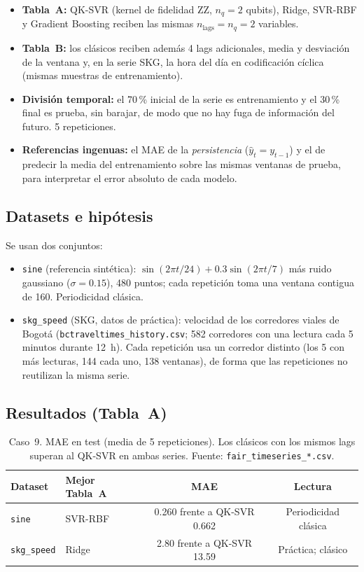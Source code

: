 \begin{itemize}
  \item \textbf{Tabla~A:} QK-SVR (kernel de fidelidad ZZ, $n_q=2$ qubits), Ridge, SVR-RBF y Gradient Boosting reciben las mismas $n_{\mathrm{lags}}=n_q=2$ variables.
  \item \textbf{Tabla~B:} los clásicos reciben además 4 lags adicionales, media y desviación de la ventana y, en la serie SKG, la hora del día en codificación cíclica (mismas muestras de entrenamiento).
  \item \textbf{División temporal:} el 70\,\% inicial de la serie es entrenamiento y el 30\,\% final es prueba, sin barajar, de modo que no hay fuga de información del futuro. 5 repeticiones.
  \item \textbf{Referencias ingenuas:} el MAE de la \emph{persistencia} ($\hat y_t=y_{t-1}$) y el de predecir la media del entrenamiento sobre las mismas ventanas de prueba, para interpretar el error absoluto de cada modelo.
\end{itemize}

\subsection{Datasets e hipótesis}

Se usan dos conjuntos:

\begin{itemize}
  \item \texttt{sine} (referencia sintética): $\sin(2\pi t/24)+0.3\sin(2\pi t/7)$ más ruido gaussiano ($\sigma=0.15$), 480 puntos; cada repetición toma una ventana contigua de 160. Periodicidad clásica.
  \item \texttt{skg\_speed} (SKG, datos de práctica): velocidad de los corredores viales de Bogotá (\texttt{bctraveltimes\_history.csv}; 582 corredores con una lectura cada 5 minutos durante 12~h). Cada repetición usa un corredor distinto (los 5 con más lecturas, 144 cada uno, 138 ventanas), de forma que las repeticiones no reutilizan la misma serie.
\end{itemize}

\subsection{Resultados (Tabla~A)}

\begin{table}[ht]
\centering
\small
\begin{tabular}{llcc}
\hline
\textbf{Dataset} & \textbf{Mejor Tabla~A} & \textbf{MAE} & \textbf{Lectura} \\
\hline
\texttt{sine} & SVR-RBF & 0.260 frente a QK-SVR 0.662 & Periodicidad clásica \\
\texttt{skg\_speed} & Ridge & 2.80 frente a QK-SVR 13.59 & Práctica; clásico \\
\hline
\end{tabular}
\caption{Caso~9. MAE en test (media de 5 repeticiones). Los clásicos con los mismos lags superan al QK-SVR en ambas series. Fuente: \texttt{fair\_timeseries\_*.csv}.}
\label{tab:timeseries_dev}
\end{table}

